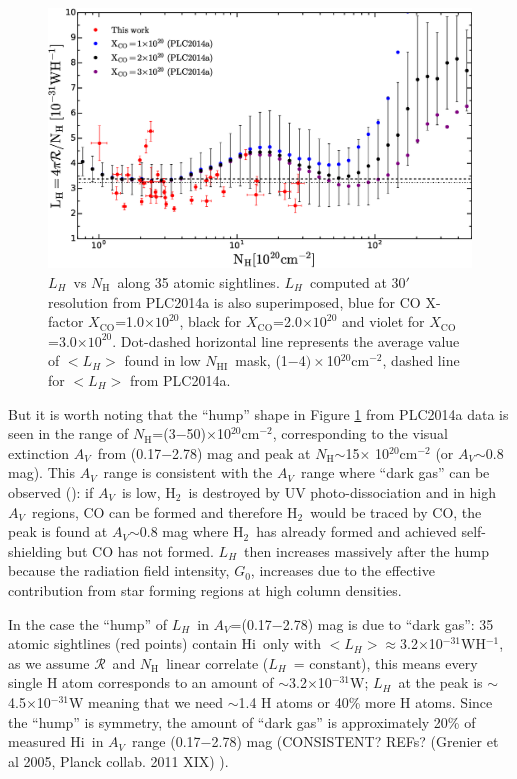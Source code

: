 \documentclass[preprint]{emulateapj}
\def\av{$A_{V}$}
\def\h2{H$_2$}
\def\hi{H{\sc i}}
\def\LH{$L_{H}$}
\def\NHI{$N_\mathrm{HI}$}
\def\NH{$N_\mathrm{H}$}
\def\rad{$\mathcal{R}$}
\def\xco{$X_\mathrm{CO}$}
\begin{document}
\begin{figure}
\includegraphics[width=1.0\linewidth]{fig/LH_vs_nh.eps}
\caption{\LH\ vs \NH\ along 35 atomic sightlines. \LH\ computed at 30$'$ resolution from PLC2014a is also superimposed, blue for CO X-factor \xco=1.0$\times$$10^{20}$, black for \xco=2.0$\times$$10^{20}$ and violet for \xco=3.0$\times$$10^{20}$. Dot-dashed horizontal line represents the average value of $<$\LH$>$ found in low \NHI\ mask, (1$-$4$)\times$10$^{20}$cm$^{-2}$, dashed line for $<$\LH$>$ from PLC2014a.}
\label{fig:lh_vs_nh}
\end{figure}

But it is worth noting that the ``hump'' shape in Figure \ref{fig:lh_vs_nh} from PLC2014a data is seen in the range of \NH=(3$-$50)$\times$10$^{20}$cm$^{-2}$, corresponding to the visual extinction \av\ from (0.17$-$2.78) mag and peak at \NH$\sim$15$\times$ 10$^{20}$cm$^{-2}$ (or \av$\sim$0.8 mag). This \av\ range is consistent with the \av\ range where ``dark gas'' can be observed (\citealt{PLC2015}): if \av\ is low, \h2\ is destroyed by UV photo-dissociation and in high \av\ regions, CO can be formed and therefore \h2\ would be traced by CO, the peak is found at \av$\sim$0.8 mag where \h2\ has already formed and achieved self-shielding but CO has not formed. \LH\ then increases massively after the hump because the radiation field intensity, $G_0$, increases due to the effective contribution from star forming regions at high column densities.

In the case the ``hump'' of \LH\ in  \av=(0.17$-$2.78) mag is due to ``dark gas'': 35 atomic sightlines (red points) contain \hi\ only with $<$\LH$>$$\approx$3.2$\times$10$^{-31}$WH$^{-1}$, as we assume \rad\ and \NH\ linear correlate (\LH\ = constant), this means every single H atom corresponds to an amount of $\sim$3.2$\times$10$^{-31}$W; \LH\ at the peak is $\sim$4.5$\times$10$^{-31}$W meaning that we need $\sim$1.4 H atoms or 40\% more H atoms. Since the ``hump'' is symmetry, the amount of ``dark gas'' is approximately 20\% of measured \hi\ in \av\ range (0.17$-$2.78) mag (CONSISTENT? REFs?  (Grenier et al 2005, Planck collab.
2011 XIX) ).
\end{document}
